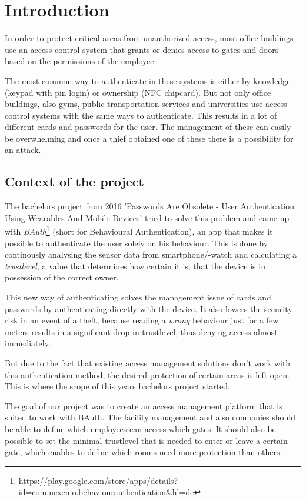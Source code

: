 \chapter{Introduction}

In order to protect critical areas from unauthorized access, most office buildings use an access control system that grants or denies access to gates and doors based on the permissions of the employee.

The most common way to authenticate in these systems is either by knowledge (keypad with pin login) or ownership (NFC chipcard).
But not only office buildings, also gyms, public transportation services and universities use access control systems with the same ways to authenticate. This results in a lot of different cards and passwords for the user. The management of these can easily be overwhelming and once a thief obtained one of these there is a possibility for an attack.

\section{Context of the project}
\label{Context of the project}

The bachelors project from 2016 'Passwords Are Obsolete - User Authentication Using Wearables And Mobile Devices' tried to solve this problem and came up with \emph{BAuth}\footnote{\url{https://play.google.com/store/apps/details?id=com.nexenio.behaviourauthentication&hl=de}} (short for Behavioural Authentication), an app that makes it possible to authenticate the user solely on his behaviour. This is done by continously analysing the sensor data from smartphone/-watch and calculating a \emph{trustlevel}, a value that determines how certain it is, that the device is in possession of the correct owner.

This new way of authenticating solves the management issue of cards and passwords by authenticating directly with the device. It also lowers the security risk in an event of a theft, because reading a \emph{wrong} behaviour just for a few meters results in a significant drop in trustlevel, thus denying access almost immediately.

But due to the fact that existing access management solutions don't work with this authentication method, the desired protection of certain areas is left open. This is where the scope of this years bachelors project started. 

The goal of our project was to create an access management platform that is suited to work with BAuth. The facility management and also companies should be able to define which employees can access which gates. It should also be possible to set the minimal trustlevel that is needed to enter or leave a certain gate, which enables to define which rooms need more protection than others.

